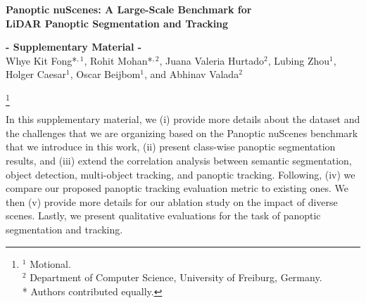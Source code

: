 \documentclass[letterpaper, 10 pt, journal, twoside]{IEEEtran}
\renewcommand{\thefootnote}{\fnsymbol{footnote}}
\renewcommand{\baselinestretch}{0.99}
\begin{document}
\typeout{}
\footnotesize



\clearpage
\renewcommand{\baselinestretch}{1}
\setlength{\belowcaptionskip}{0pt}

\begin{strip}
\begin{center}
\vspace{-5ex}
\textbf{\LARGE \bf
Panoptic nuScenes: A Large-Scale Benchmark for\\\vspace{0.5ex}LiDAR Panoptic Segmentation and Tracking} \\
\vspace{2ex}

\Large{\bf- Supplementary Material -}\\
\vspace{0.4cm}
\normalsize{Whye Kit Fong*$^{,1}$, Rohit Mohan*$^{,2}$, Juana Valeria Hurtado$^2$, Lubing Zhou$^1$,\\ Holger Caesar$^1$, Oscar Beijbom$^1$, and Abhinav Valada$^{2}$}
\end{center}
\end{strip}

\setcounter{section}{0}
\setcounter{equation}{0}
\setcounter{figure}{0}
\setcounter{table}{0}
\setcounter{page}{1}
\makeatletter

\renewcommand{\thesection}{S.\arabic{section}}
\renewcommand{\thesubsection}{S.\arabic{subsection}}
\renewcommand{\thetable}{S.\arabic{table}}
\renewcommand{\thefigure}{S.\arabic{figure}}



\let\thefootnote\relax\footnote{$^1$ Motional.\\
$^2$ Department of Computer Science, University of Freiburg, Germany.\\
* Authors contributed equally.}

\normalsize

In this supplementary material, we (i) provide more details about the dataset and the challenges that we are organizing based on the Panoptic nuScenes benchmark that we introduce in this work, (ii) present class-wise panoptic segmentation results, and (iii) extend the correlation analysis between semantic segmentation, object detection, multi-object tracking, and panoptic tracking. Following, (iv) we compare our proposed panoptic tracking evaluation metric to existing ones. We then (v) provide more details for our ablation study on the impact of diverse scenes. Lastly, we present qualitative evaluations for the task of panoptic segmentation and tracking.
\end{document}
